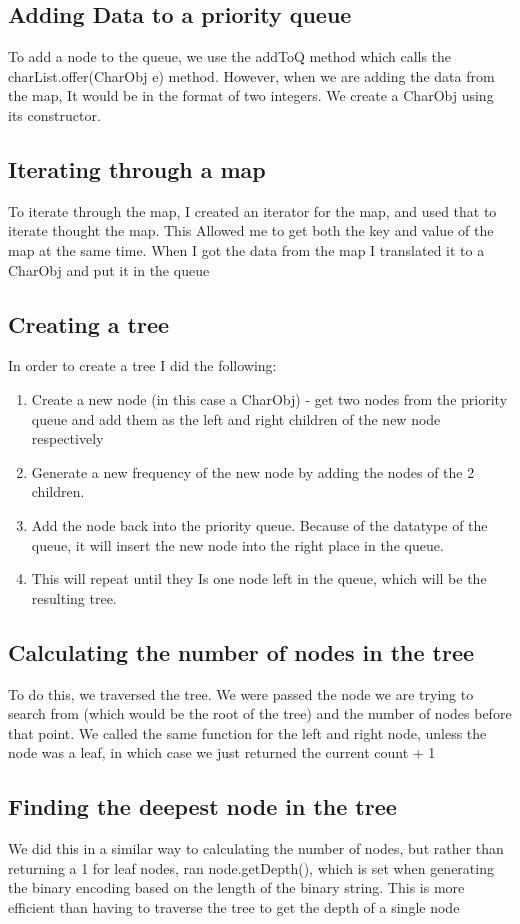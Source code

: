 \documentclass[11pt, oneside]{amsart}
\begin{document}
	\subsection{Adding Data to a priority queue}
		To add a node to the queue, we use the addToQ method which calls the charList.offer(CharObj e) method. However, when we are adding the data from the map, It would be in the format of two integers. We create a CharObj using its constructor.
	\subsection{Iterating through a map}
		To iterate through the map, I created an iterator for the map, and used that to iterate thought the map. This Allowed me to get both the key and value of the map at the same time. When I got the data from the map I translated it to a CharObj and put it in the queue
	\subsection{Creating a tree}
		In order to create a tree I did the following:
		\begin{enumerate}
			\item Create a new node (in this case a CharObj) - get two nodes from the priority queue and add them as the left and right children of the new node respectively
			\item Generate a new frequency of the new node by adding the nodes of the 2 children.
			\item Add the node back into the priority queue. Because of the datatype of the queue, it will insert the new 	node into the right place in the queue.
			\item This will repeat until they Is one node left in the queue, which will be the resulting tree.
		\end{enumerate}
	\subsection{Calculating the number of nodes in the tree}
		To do this, we traversed the tree. We were passed the node we are trying to search from (which would be the root of the tree) and the number of nodes before that point. We called the same function for the left and right node, unless the node was a leaf, in which case we just returned the current count + 1
	\subsection{Finding the deepest node in the tree}
		We did this in a similar way to calculating the number of nodes, but rather than returning a 1 for leaf nodes, ran node.getDepth(), which is set when generating the binary encoding based on the length of the binary string. This is more efficient than having to traverse the tree to get the depth of a single node
\end{document}
